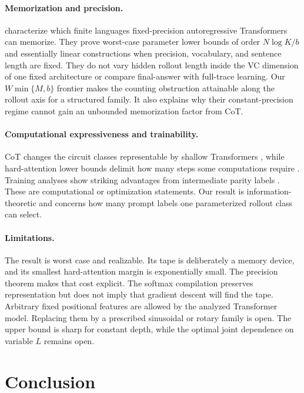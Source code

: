 \documentclass{article}
\newcommand{\1}{\mathbf 1}
\begin{document}
\paragraph{Memorization and precision.}
\citet{yu2025memorization} characterize which finite languages fixed-precision autoregressive
Transformers can memorize. They prove worst-case parameter lower bounds of order
$N\log K/b$ and essentially linear constructions when precision, vocabulary, and sentence length
are fixed. They do not vary hidden rollout length inside the VC dimension of one fixed architecture
or compare final-answer with full-trace learning. Our $W\min\{M,b\}$ frontier makes the counting
obstruction attainable along the rollout axis for a structured family. It also explains why their
constant-precision regime cannot gain an unbounded memorization factor from CoT.

\paragraph{Computational expressiveness and trainability.}
CoT changes the circuit classes representable by shallow Transformers
\citep{merrill2023expressive,li2024serial}, while hard-attention lower bounds delimit how many
steps some computations require \citep{bavandpour2025lower}. Training analyses show striking
advantages from intermediate parity labels \citep{kim2025parity}. These are computational or
optimization statements. Our result is information-theoretic and concerns how many prompt labels
one parameterized rollout class can select.

\paragraph{Limitations.}
The result is worst case and realizable. Its tape is deliberately a memory device, and its smallest
hard-attention margin is exponentially small. The precision theorem makes that cost explicit. The
softmax compilation preserves representation but does not imply that gradient descent will find the
tape. Arbitrary fixed positional features are allowed by the analyzed Transformer model. Replacing
them by a prescribed sinusoidal or rotary family is open. The upper bound is sharp for constant
depth, while the optimal joint dependence on variable $L$ remains open.

\section{Conclusion}
\end{document}
